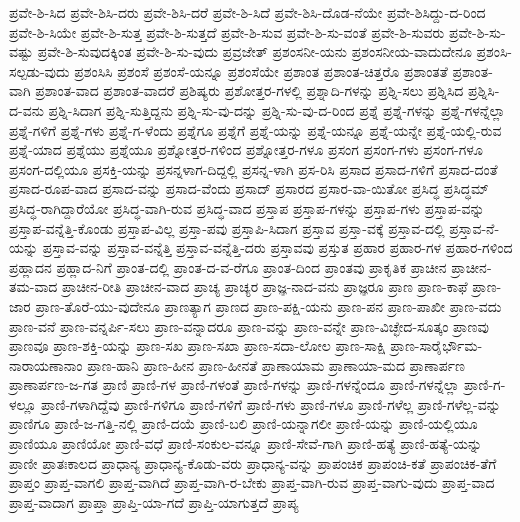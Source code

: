 {ಪ್ರವೇ-ಶಿ-ಸಿದ
ಪ್ರವೇ-ಶಿಸಿ-ದರು
ಪ್ರವೇ-ಶಿಸಿ-ದರೆ
ಪ್ರವೇ-ಶಿ-ಸಿದೆ
ಪ್ರವೇ-ಶಿಸಿ-ದೊಡ-ನೆಯೇ
ಪ್ರವೇ-ಶಿಸಿದ್ದು-ದ-ರಿಂದ
ಪ್ರವೇ-ಶಿ-ಸಿಯೇ
ಪ್ರವೇ-ಶಿ-ಸುತ್ತ
ಪ್ರವೇ-ಶಿ-ಸುತ್ತದೆ
ಪ್ರವೇ-ಶಿ-ಸುವ
ಪ್ರವೇ-ಶಿ-ಸು-ವಂತೆ
ಪ್ರವೇ-ಶಿ-ಸುವರು
ಪ್ರವೇ-ಶಿ-ಸು-ವಷ್ಟು
ಪ್ರವೇ-ಶಿ-ಸುವುದಕ್ಕಿಂತ
ಪ್ರವೇ-ಶಿ-ಸು-ವುದು
ಪ್ರವ್ರಜೇತ್
ಪ್ರಶಂಸನೀ-ಯನು
ಪ್ರಶಂಸನೀಯ-ವಾದುದೇನೂ
ಪ್ರಶಂಸಿ-ಸಲ್ಪಡು-ವುದು
ಪ್ರಶಂಸಿಸಿ
ಪ್ರಶಂಸೆ
ಪ್ರಶಂಸೆ-ಯನ್ನೂ
ಪ್ರಶಂಸೆಯೇ
ಪ್ರಶಾಂತ
ಪ್ರಶಾಂತ-ಚಿತ್ತರೊ
ಪ್ರಶಾಂತತೆ
ಪ್ರಶಾಂತ-ವಾಗಿ
ಪ್ರಶಾಂತ-ವಾದ
ಪ್ರಶಾಂತ-ವಾದರೆ
ಪ್ರಶಿಷ್ಯರು
ಪ್ರಶೋತ್ತರ-ಗಳಲ್ಲಿ
ಪ್ರಶ್ನಾದಿ-ಗಳನ್ನು
ಪ್ರಶ್ನಿ-ಸಲು
ಪ್ರಶ್ನಿಸಿದ
ಪ್ರಶ್ನಿಸಿ-ದ-ವನು
ಪ್ರಶ್ನಿ-ಸಿದಾಗ
ಪ್ರಶ್ನಿ-ಸುತ್ತಿದ್ದನು
ಪ್ರಶ್ನಿ-ಸು-ವು-ದನ್ನು
ಪ್ರಶ್ನಿ-ಸು-ವು-ದ-ರಿಂದ
ಪ್ರಶ್ನೆ
ಪ್ರಶ್ನೆ-ಗಳನ್ನು
ಪ್ರಶ್ನೆ-ಗಳನ್ನೆಲ್ಲಾ
ಪ್ರಶ್ನೆ-ಗಳಿಗೆ
ಪ್ರಶ್ನೆ-ಗಳು
ಪ್ರಶ್ನೆ-ಗ-ಳೆಂದು
ಪ್ರಶ್ನೆಗೂ
ಪ್ರಶ್ನೆಗೆ
ಪ್ರಶ್ನೆ-ಯನ್ನು
ಪ್ರಶ್ನೆ-ಯನ್ನೂ
ಪ್ರಶ್ನೆ-ಯನ್ನೇ
ಪ್ರಶ್ನೆ-ಯಲ್ಲಿ-ರುವ
ಪ್ರಶ್ನೆ-ಯಾದ
ಪ್ರಶ್ನೆಯು
ಪ್ರಶ್ನೆಯೂ
ಪ್ರಶ್ನೋತ್ತರ-ಗಳಿಂದ
ಪ್ರಶ್ನೋತ್ತರ-ಗಳೂ
ಪ್ರಸಂಗ
ಪ್ರಸಂಗ-ಗಳು
ಪ್ರಸಂಗ-ಗಳೂ
ಪ್ರಸಂಗ-ದಲ್ಲಿಯೂ
ಪ್ರಸಕ್ತಿ-ಯನ್ನು
ಪ್ರಸನ್ನಳಾಗ-ದಿದ್ದಲ್ಲಿ
ಪ್ರಸನ್ನ-ಳಾಗಿ
ಪ್ರಸ-ರಿಸಿ
ಪ್ರಸಾದ
ಪ್ರಸಾದ-ಗಳಿಗೆ
ಪ್ರಸಾದ-ದಂತೆ
ಪ್ರಸಾದ-ರೂಪ-ವಾದ
ಪ್ರಸಾದ-ವನ್ನು
ಪ್ರಸಾದ-ವೆಂದು
ಪ್ರಸಾದ್
ಪ್ರಸಾರದ
ಪ್ರಸಾರ-ವಾ-ಯಿತೋ
ಪ್ರಸಿದ್ಧ
ಪ್ರಸಿದ್ಧಮ್
ಪ್ರಸಿದ್ಧ-ರಾಗಿದ್ದಾರೆಯೋ
ಪ್ರಸಿದ್ಧ-ವಾಗಿ-ರುವ
ಪ್ರಸಿದ್ಧ-ವಾದ
ಪ್ರಸ್ತಾಪ
ಪ್ರಸ್ತಾಪ-ಗಳನ್ನು
ಪ್ರಸ್ತಾಪ-ಗಳು
ಪ್ರಸ್ತಾಪ-ವನ್ನು
ಪ್ರಸ್ತಾಪ-ವನ್ನೆತ್ತಿ-ಕೊಂಡು
ಪ್ರಸ್ತಾಪ-ವಿಲ್ಲ
ಪ್ರಸ್ತಾ-ಪವು
ಪ್ರಸ್ತಾಪಿ-ಸಿದಾಗ
ಪ್ರಸ್ತಾವ
ಪ್ರಸ್ತಾ-ವಕ್ಕೆ
ಪ್ರಸ್ತಾವ-ದಲ್ಲಿ
ಪ್ರಸ್ತಾವ-ನೆ-ಯನ್ನು
ಪ್ರಸ್ತಾವ-ವನ್ನು
ಪ್ರಸ್ತಾವ-ವನ್ನೆತ್ತಿ
ಪ್ರಸ್ತಾವ-ವನ್ನೆತ್ತಿ-ದರು
ಪ್ರಸ್ತಾವವು
ಪ್ರಸ್ತುತ
ಪ್ರಹಾರ
ಪ್ರಹಾರ-ಗಳ
ಪ್ರಹಾರ-ಗಳಿಂದ
ಪ್ರಹ್ಲಾದನ
ಪ್ರಹ್ಲಾದ-ನಿಗೆ
ಪ್ರಾಂತ-ದಲ್ಲಿ
ಪ್ರಾಂತ-ದ-ವ-ರೆಗೂ
ಪ್ರಾಂತ-ದಿಂದ
ಪ್ರಾಂತವು
ಪ್ರಾಕೃತಿಕ
ಪ್ರಾಚೀನ
ಪ್ರಾಚೀನ-ತಮ-ವಾದ
ಪ್ರಾಚೀನ-ರೀತಿ
ಪ್ರಾಚೀನ-ವಾದ
ಪ್ರಾಚ್ಯ
ಪ್ರಾಚ್ಯರ
ಪ್ರಾಜ್ಞ-ನಾದ-ವನು
ಪ್ರಾಜ್ಞರೂ
ಪ್ರಾಣ
ಪ್ರಾಣ-ಕಾಫೆ
ಪ್ರಾಣ-ಜಾರ
ಪ್ರಾಣ-ತೊರೆ-ಯು-ವುದೇನೂ
ಪ್ರಾಣತ್ಯಾಗ
ಪ್ರಾಣದ
ಪ್ರಾಣ-ಪಕ್ಷಿ-ಯನು
ಪ್ರಾಣ-ಪನ
ಪ್ರಾಣ-ಪಾಖೀ
ಪ್ರಾಣ-ವದು
ಪ್ರಾಣ-ವನೆ
ಪ್ರಾಣ-ವನ್ನರ್ಪಿ-ಸಲು
ಪ್ರಾಣ-ವನ್ನಾದರೂ
ಪ್ರಾಣ-ವನ್ನು
ಪ್ರಾಣ-ವನ್ನೇ
ಪ್ರಾಣ-ವಿಚ್ಛೇದ-ಸೂತ್ಕಂ
ಪ್ರಾಣವು
ಪ್ರಾಣವೂ
ಪ್ರಾಣ-ಶಕ್ತಿ-ಯನ್ನು
ಪ್ರಾಣ-ಸಖ
ಪ್ರಾಣ-ಸಖಾ
ಪ್ರಾಣ-ಸದಾ-ಲೋಲ
ಪ್ರಾಣ-ಸಾಕ್ಷಿ
ಪ್ರಾಣ-ಸಾರೈರ್ಭೌಮ-ನಾರಾಯಣಾನಾಂ
ಪ್ರಾಣ-ಹಾನಿ
ಪ್ರಾಣ-ಹೀನ
ಪ್ರಾಣ-ಹೀನತೆ
ಪ್ರಾಣಾಯಾಮ
ಪ್ರಾಣಾಯಾ-ಮದ
ಪ್ರಾಣಾರ್ಪಣ
ಪ್ರಾಣಾರ್ಪಣ-ಜ-ಗತ
ಪ್ರಾಣಿ
ಪ್ರಾಣಿ-ಗಳ
ಪ್ರಾಣಿ-ಗಳಂತೆ
ಪ್ರಾಣಿ-ಗಳನ್ನು
ಪ್ರಾಣಿ-ಗಳನ್ನೆಂದೂ
ಪ್ರಾಣಿ-ಗಳನ್ನೆಲ್ಲಾ
ಪ್ರಾಣಿ-ಗ-ಳಲ್ಲೂ
ಪ್ರಾಣಿ-ಗಳಾಗಿದ್ದೆವು
ಪ್ರಾಣಿ-ಗಳಿಗೂ
ಪ್ರಾಣಿ-ಗಳಿಗೆ
ಪ್ರಾಣಿ-ಗಳು
ಪ್ರಾಣಿ-ಗಳೂ
ಪ್ರಾಣಿ-ಗಳೆಲ್ಲ
ಪ್ರಾಣಿ-ಗಳೆಲ್ಲ-ವನ್ನು
ಪ್ರಾಣಿಗೂ
ಪ್ರಾಣಿ-ಜ-ಗತ್ತಿ-ನಲ್ಲಿ
ಪ್ರಾಣಿ-ದಯೆ
ಪ್ರಾಣಿ-ಬಲಿ
ಪ್ರಾಣಿ-ಯನ್ನಾಗಲೀ
ಪ್ರಾಣಿ-ಯನ್ನು
ಪ್ರಾಣಿ-ಯಲ್ಲಿಯೂ
ಪ್ರಾಣಿಯೂ
ಪ್ರಾಣಿಯೋ
ಪ್ರಾಣಿ-ವಧೆ
ಪ್ರಾಣಿ-ಸಂಕುಲ-ವನ್ನೂ
ಪ್ರಾಣಿ-ಸೇವೆ-ಗಾಗಿ
ಪ್ರಾಣಿ-ಹತ್ಯೆ
ಪ್ರಾಣಿ-ಹತ್ಯೆ-ಯನ್ನು
ಪ್ರಾಣೀ
ಪ್ರಾತಃಕಾಲದ
ಪ್ರಾಧಾನ್ಯ
ಪ್ರಾಧಾನ್ಯ-ಕೊಡು-ವರು
ಪ್ರಾಧಾನ್ಯ-ವನ್ನು
ಪ್ರಾಪಂಚಿಕ
ಪ್ರಾಪಂಚಿ-ಕತೆ
ಪ್ರಾಪಂಚಿಕ-ತೆಗೆ
ಪ್ರಾಪ್ತಂ
ಪ್ರಾಪ್ತ-ವಾಗಲಿ
ಪ್ರಾಪ್ತ-ವಾಗಿದೆ
ಪ್ರಾಪ್ತ-ವಾಗಿ-ರ-ಬೇಕು
ಪ್ರಾಪ್ತ-ವಾಗಿ-ರುವ
ಪ್ರಾಪ್ತ-ವಾಗು-ವುದು
ಪ್ರಾಪ್ತ-ವಾದ
ಪ್ರಾಪ್ತ-ವಾದಾಗ
ಪ್ರಾಪ್ತಾ
ಪ್ರಾಪ್ತಿ-ಯಾ-ಗದೆ
ಪ್ರಾಪ್ತಿ-ಯಾಗುತ್ತದೆ
ಪ್ರಾಪ್ಯ
}
